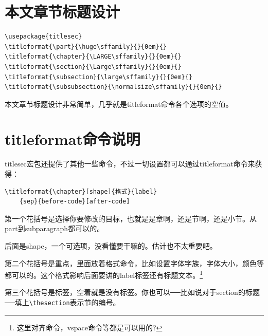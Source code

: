 \documentclass[11pt,oneside]{book}
\begin{document}
\section{本文章节标题设计}
\begin{Verbatim}
\usepackage{titlesec}
\titleformat{\part}{\huge\sffamily}{}{0em}{} 
\titleformat{\chapter}{\LARGE\sffamily}{}{0em}{} 
\titleformat{\section}{\Large\sffamily}{}{0em}{}
\titleformat{\subsection}{\large\sffamily}{}{0em}{}
\titleformat{\subsubsection}{\normalsize\sffamily}{}{0em}{}
\end{Verbatim}
本文章节标题设计非常简单，几乎就是titleformat命令各个选项的空值。

\section{titleformat命令说明}
titlesec宏包还提供了其他一些命令，不过一切设置都可以通过titleformat命令来获得：
\begin{Verbatim}
\titleformat{\chapter}[shape]{格式}{label}
    {sep}{before-code}[after-code]
\end{Verbatim}
第一个花括号是选择你要修改的目标，也就是是章啊，还是节啊，还是小节。从part到subparagraph都可以的。

后面是shape，一个可选项，没看懂要干嘛的。估计也不太重要吧。

第二个花括号是重点，里面放着格式命令，比如设置字体字族，字体大小，颜色等都可以的。这个格式影响后面要讲的label标签还有标题文本。\footnote{这里对齐命令，vspace命令等都是可以用的?}

第三个花括号是标签，空着就是没有标签。你也可以──比如说对于section的标题──填上\verb+\thesection+表示节的编号。
\end{document}
